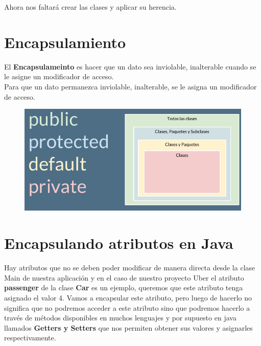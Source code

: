 \documentclass{article}
\begin{document}
Ahora nos faltará crear las clases y aplicar su herencia.



\section{Encapsulamiento}%
El \textbf{Encapsulameinto} es hacer que un dato sea inviolable, inalterable
cuando se le asigne un modificador de acceso.\\

Para que un dato permanezca inviolable, inalterable, se le asigna un
modificador de acceso.\\

\begin{figure}[h!]
  \centering
  \includegraphics[scale=0.75]{./Pictures/021_encapsulamiento.png}
\end{figure}

\section{Encapsulando atributos en Java}%
Hay atributos que no se deben poder modificar de manera directa desde la clase
Main de nuestra aplicación y en el caso de nuestro proyecto Uber el atributo
\textbf{passenger} de la clase \textbf{Car} es un ejemplo, queremos que este
atributo tenga asignado el valor 4. Vamos a encapsular este atributo, pero
luego de hacerlo no significa que no podremos acceder a este atributo sino que
podremos hacerlo a través de métodos disponibles en muchos lenguajes y por
supuesto en java llamados \textbf{Getters y Setters} que nos permiten obtener
sus valores y asignarles respectivamente.\\
\end{document}
